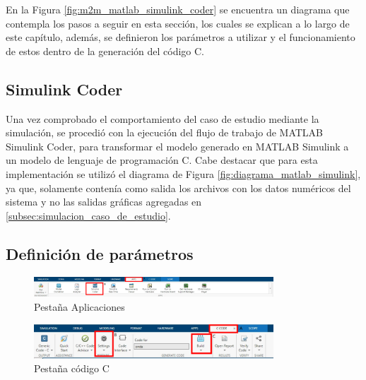 En la Figura \ref{fig:m2m_matlab_simulink_coder} se encuentra un diagrama que contempla los pasos a seguir en esta sección, los cuales se explican a lo largo de este capítulo, además, se definieron los parámetros a utilizar y el funcionamiento de estos dentro de la generación del código C.

\subsection{Simulink Coder}\label{subsec:simulink_coder}

Una vez comprobado el comportamiento del caso de estudio mediante la simulación, se procedió con la ejecución del flujo de trabajo de MATLAB Simulink Coder, para transformar el modelo generado en MATLAB Simulink a un modelo de lenguaje de programación C. Cabe destacar que para esta implementación se utilizó el diagrama de Figura \ref{fig:diagrama_matlab_simulink}, ya que, solamente contenía como salida los archivos con los datos numéricos del sistema y no las salidas gráficas agregadas en \ref{subsec:simulacion_caso_de_estudio}.


\subsection{Definición de parámetros}

\begin{figure}[h!]
    \centering
    \includegraphics[width=0.8\textwidth]{fig/especifico_2/M2MT/paso_a_paso_mtmt/apps.pdf}
    \caption{Pestaña Aplicaciones}
    \label{fig:pestana_apps}
\end{figure}
\newpage 

\begin{figure}[h!]
    \centering
    \includegraphics[width=0.8\textwidth]{fig/especifico_2/M2MT/paso_a_paso_mtmt/c_code.pdf}
    \caption{Pestaña código C}
    \label{fig:pestana_c_code}
\end{figure}

